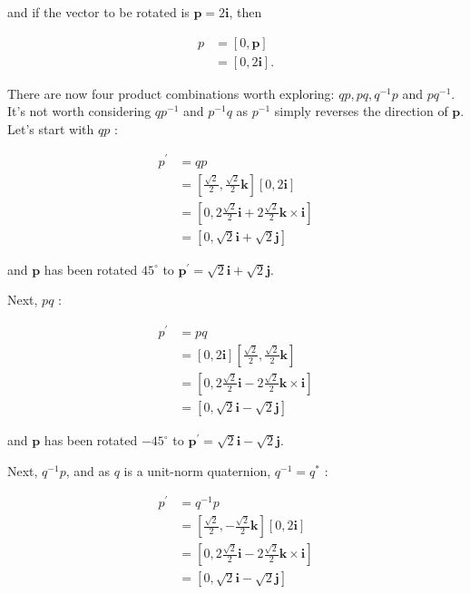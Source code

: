 and if the vector to be rotated is $\mathbf{p}=2 \mathbf{i}$, then

$$
\begin{aligned}
p & =[0, \mathbf{p}] \\
& =[0,2 \mathbf{i}] .
\end{aligned}
$$

There are now four product combinations worth exploring: $q p, p q, q^{-1} p$ and $p q^{-1}$. It's not worth considering $q p^{-1}$ and $p^{-1} q$ as $p^{-1}$ simply reverses the direction of $\mathbf{p}$. Let's start with $q p$ :

$$
\begin{aligned}
p^{\prime} & =q p \\
& =\left[\frac{\sqrt{2}}{2}, \frac{\sqrt{2}}{2} \mathbf{k}\right][0,2 \mathbf{i}] \\
& =\left[0,2 \frac{\sqrt{2}}{2} \mathbf{i}+2 \frac{\sqrt{2}}{2} \mathbf{k} \times \mathbf{i}\right] \\
& =[0, \sqrt{2} \mathbf{i}+\sqrt{2} \mathbf{j}]
\end{aligned}
$$

and $\mathbf{p}$ has been rotated $45^{\circ}$ to $\mathbf{p}^{\prime}=\sqrt{2} \mathbf{i}+\sqrt{2} \mathbf{j}$.

Next, $p q$ :

$$
\begin{aligned}
p^{\prime} & =p q \\
& =[0,2 \mathbf{i}]\left[\frac{\sqrt{2}}{2}, \frac{\sqrt{2}}{2} \mathbf{k}\right] \\
& =\left[0,2 \frac{\sqrt{2}}{2} \mathbf{i}-2 \frac{\sqrt{2}}{2} \mathbf{k} \times \mathbf{i}\right] \\
& =[0, \sqrt{2} \mathbf{i}-\sqrt{2} \mathbf{j}]
\end{aligned}
$$

and $\mathbf{p}$ has been rotated $-45^{\circ}$ to $\mathbf{p}^{\prime}=\sqrt{2} \mathbf{i}-\sqrt{2} \mathbf{j}$.

Next, $q^{-1} p$, and as $q$ is a unit-norm quaternion, $q^{-1}=q^{*}$ :

$$
\begin{aligned}
p^{\prime} & =q^{-1} p \\
& =\left[\frac{\sqrt{2}}{2},-\frac{\sqrt{2}}{2} \mathbf{k}\right][0,2 \mathbf{i}] \\
& =\left[0,2 \frac{\sqrt{2}}{2} \mathbf{i}-2 \frac{\sqrt{2}}{2} \mathbf{k} \times \mathbf{i}\right] \\
& =[0, \sqrt{2} \mathbf{i}-\sqrt{2} \mathbf{j}]
\end{aligned}
$$

